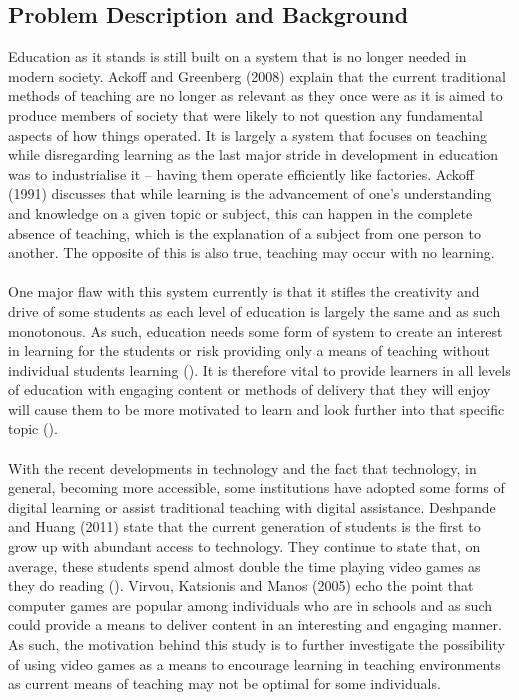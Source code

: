 \subsection{Problem Description and Background}
Education as it stands is still built on a system that is no longer needed in modern society. Ackoff and Greenberg (2008) explain that the current traditional methods of teaching are no longer as relevant as they once were as it is aimed to produce members of society that were likely to not question any fundamental aspects of how things operated. It is largely a system that focuses on teaching while disregarding learning as the last major stride in development in education was to industrialise it – having them operate efficiently like factories. Ackoff (1991) discusses that while learning is the advancement of one’s understanding and knowledge on a given topic or subject, this can happen in the complete absence of teaching, which is the explanation of a subject from one person to another. The opposite of this is also true, teaching may occur with no learning.
\\\\
One major flaw with this system currently is that it stifles the creativity and drive of some students as each level of education is largely the same and as such monotonous. As such, education needs some form of system to create an interest in learning for the students or risk providing only a means of teaching without individual students learning (\cite{Ackoff2008}). It is therefore vital to provide learners in all levels of education with engaging content or methods of delivery that they will enjoy will cause them to be more motivated to learn and look further into that specific topic (\cite{Ackoff2008}). 
\\\\
With the recent developments in technology and the fact that technology, in general, becoming more accessible, some institutions have adopted some forms of digital learning or assist traditional teaching with digital assistance. Deshpande and Huang (2011) state that the current generation of students is the first to grow up with abundant access to technology. They continue to state that, on average, these students spend almost double the time playing video games as they do reading (\cite{Deshpande2011}).
\newpage
Virvou, Katsionis and Manos (2005) echo the point that computer games are popular among individuals who are in schools and as such could provide a means to deliver content in an interesting and engaging manner. As such, the motivation behind this study is to further investigate the possibility of using video games as a means to encourage learning in teaching environments as current means of teaching may not be optimal for some individuals. 

